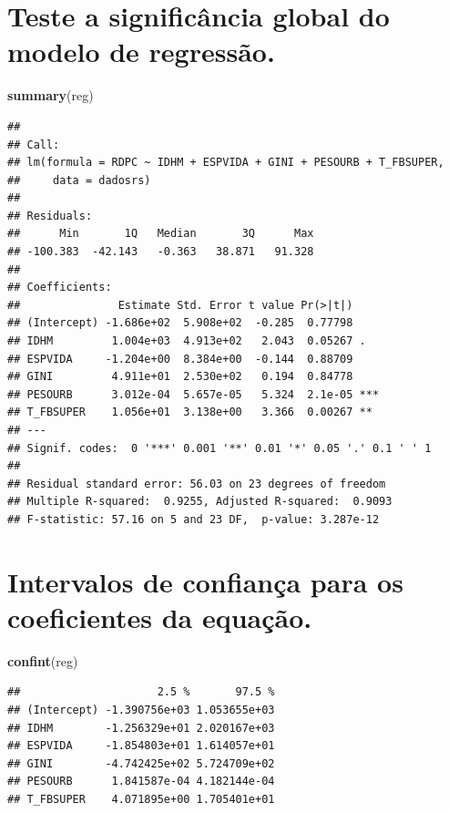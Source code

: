 \documentclass[]{article}
\newenvironment{Shaded}{\begin{snugshade}}{\end{snugshade}}
\newcommand{\KeywordTok}[1]{\textcolor[rgb]{0.13,0.29,0.53}{\textbf{#1}}}
\newcommand{\NormalTok}[1]{#1}
\begin{document}
\section{Teste a significância global do modelo de
regressão.}\label{teste-a-significancia-global-do-modelo-de-regressao.}

\begin{Shaded}
\begin{Highlighting}[]
\KeywordTok{summary}\NormalTok{(reg)}
\end{Highlighting}
\end{Shaded}

\begin{verbatim}
## 
## Call:
## lm(formula = RDPC ~ IDHM + ESPVIDA + GINI + PESOURB + T_FBSUPER, 
##     data = dadosrs)
## 
## Residuals:
##      Min       1Q   Median       3Q      Max 
## -100.383  -42.143   -0.363   38.871   91.328 
## 
## Coefficients:
##               Estimate Std. Error t value Pr(>|t|)    
## (Intercept) -1.686e+02  5.908e+02  -0.285  0.77798    
## IDHM         1.004e+03  4.913e+02   2.043  0.05267 .  
## ESPVIDA     -1.204e+00  8.384e+00  -0.144  0.88709    
## GINI         4.911e+01  2.530e+02   0.194  0.84778    
## PESOURB      3.012e-04  5.657e-05   5.324  2.1e-05 ***
## T_FBSUPER    1.056e+01  3.138e+00   3.366  0.00267 ** 
## ---
## Signif. codes:  0 '***' 0.001 '**' 0.01 '*' 0.05 '.' 0.1 ' ' 1
## 
## Residual standard error: 56.03 on 23 degrees of freedom
## Multiple R-squared:  0.9255, Adjusted R-squared:  0.9093 
## F-statistic: 57.16 on 5 and 23 DF,  p-value: 3.287e-12
\end{verbatim}

\section{Intervalos de confiança para os coeficientes da
equação.}\label{intervalos-de-confianca-para-os-coeficientes-da-equacao.}

\begin{Shaded}
\begin{Highlighting}[]
\KeywordTok{confint}\NormalTok{(reg)}
\end{Highlighting}
\end{Shaded}

\begin{verbatim}
##                     2.5 %       97.5 %
## (Intercept) -1.390756e+03 1.053655e+03
## IDHM        -1.256329e+01 2.020167e+03
## ESPVIDA     -1.854803e+01 1.614057e+01
## GINI        -4.742425e+02 5.724709e+02
## PESOURB      1.841587e-04 4.182144e-04
## T_FBSUPER    4.071895e+00 1.705401e+01
\end{verbatim}
\end{document}
